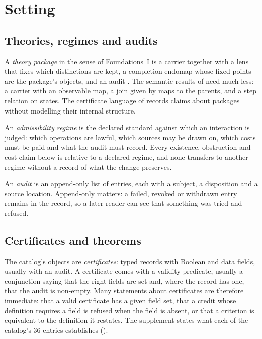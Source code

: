 \section{Setting}
\label{sec:setting}

\subsection{Theories, regimes and audits}

A \emph{theory package} in the sense of Foundations~I is a carrier together with a lens
that fixes which distinctions are kept, a completion endomap whose fixed points are the
package's objects, and an audit \citep{TsiokosFoundationsI}. The semantic results of
 need much less: a carrier with an observable map, a
join given by maps to the parents, and a step relation on states. The certificate
language of  records claims about packages without modelling their
internal structure.

An \emph{admissibility regime} is the declared standard against which an interaction is
judged: which operations are lawful, which sources may be drawn on, which costs must be
paid and what the audit must record. Every existence, obstruction and cost claim below is
relative to a declared regime, and none transfers to another regime without a record of
what the change preserves.

An \emph{audit} is an append-only list of entries, each with a subject, a disposition and
a source location. Append-only matters: a failed, revoked or withdrawn entry remains in
the record, so a later reader can see that something was tried and refused.

\subsection{Certificates and theorems}
\label{sec:setting-kinds}

The catalog's objects are \emph{certificates}: typed records with Boolean and data fields,
usually with an audit. A certificate comes with a validity predicate, usually a conjunction saying
that the right fields are set and, where the record has one, that the audit is non-empty. Many statements about
certificates are therefore immediate: that a valid certificate has a given field set, that
a credit whose definition requires a field is refused when the field is absent, or that a
criterion is equivalent to the definition it restates. The supplement states what each of the
catalog's 36 entries establishes ().

